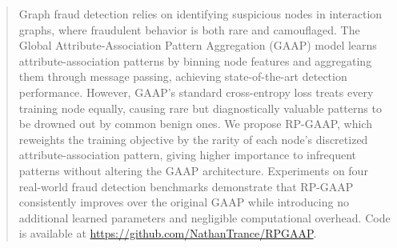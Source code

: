 \begin{abstract}
Graph fraud detection relies on identifying suspicious nodes in interaction graphs, where fraudulent behavior is both rare and camouflaged. The Global Attribute-Association Pattern Aggregation (GAAP) model learns attribute-association patterns by binning node features and aggregating them through message passing, achieving state-of-the-art detection performance. However, GAAP's standard cross-entropy loss treats every training node equally, causing rare but diagnostically valuable patterns to be drowned out by common benign ones. We propose RP-GAAP, which reweights the training objective by the rarity of each node's discretized attribute-association pattern, giving higher importance to infrequent patterns without altering the GAAP architecture. Experiments on four real-world fraud detection benchmarks demonstrate that RP-GAAP consistently improves over the original GAAP while introducing no additional learned parameters and negligible computational overhead. Code is available at \url{https://github.com/NathanTrance/RPGAAP}.
\end{abstract}
